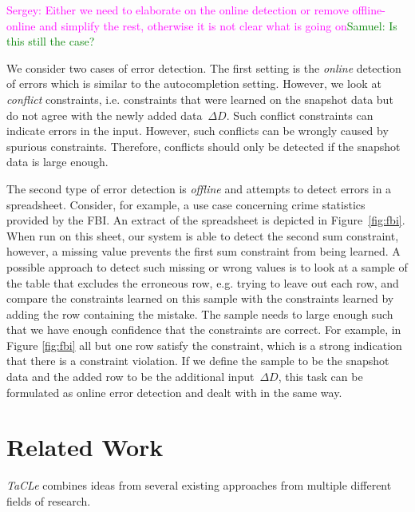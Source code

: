 \documentclass{IEEEtran}
\newcommand{\sergey}[1]{\textcolor{magenta}{{\sc Sergey:} #1}\xspace}
\newcommand{\samuel}[1]{\textcolor{green}{{\sc Samuel:} #1}\xspace}
\newcommand{\format}[1]{\textit{#1}\xspace}
\newcommand{\sname}{\format{TaCLe}}
\theoremstyle{definition}
\begin{document}
\sergey{Either we need to elaborate on the online detection or remove offline-online and simplify the rest, otherwise it is not clear what is going on}\samuel{Is this still the case?}

We consider two cases of error detection.
The first setting is the \textit{online} detection of errors which is similar to the autocompletion setting.
However, we look at \textit{conflict} constraints, i.e. constraints that were learned on the snapshot data but do not agree with the newly added data~$\Delta D$.
Such conflict constraints can indicate errors in the input.
However, such conflicts can be wrongly caused by spurious constraints.
Therefore, conflicts should only be detected if the snapshot data is large enough.

The second type of error detection is \textit{offline} and attempts to detect errors in a spreadsheet.
Consider, for example, a use case concerning crime statistics provided by the FBI.
An extract of the spreadsheet is depicted in Figure~\ref{fig:fbi}.
When run on this sheet, our system is able to detect the second sum constraint, however, a missing value prevents the first sum constraint from being learned.
A possible approach to detect such missing or wrong values is to look at a sample of the table that excludes the erroneous row, e.g. trying to leave out each row, and compare the constraints learned on this sample with the constraints learned by adding the row containing the mistake.
The sample needs to large enough such that we have enough confidence that the constraints are correct. For example, in Figure \ref{fig:fbi} all but one row satisfy the constraint, which is a strong indication that there is a constraint violation.
If we define the sample to be the snapshot data and the added row to be the additional input~$\Delta D$, this task can be formulated as online error detection and dealt with in the same way.

\section{Related Work}\label{sec:related_work}
\sname combines ideas from several existing
approaches from multiple different fields of research.
\end{document}
